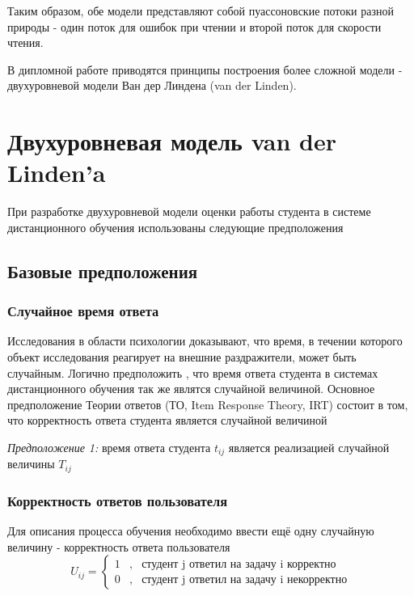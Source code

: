 Таким образом, обе модели представляют собой пуассоновские потоки разной природы - один поток для ошибок при чтении и второй поток для скорости чтения.

В дипломной работе приводятся принципы построения более сложной модели - \\двухуровневой модели Ван дер Линдена (van der Linden).

\section{Двухуровневая модель van der Linden'a}

При разработке двухуровневой модели оценки работы студента в системе \\дистанционного обучения использованы следующие предположения

\subsection{Базовые предположения}

\subsubsection{Случайное время ответа}

Исследования в области психологии доказывают, что время, в течении которого объект исследования реагирует на внешние раздражители, может быть случайным. Логично предположить , что время ответа студента в сис\-темах дистанционного обучения так же являтся случайной величиной. Ос\-новное предположение Теории ответов (ТО, Item Response Theory, IRT) со\-стоит в том, что корректность ответа студента является случайной величиной

{\itshape Предположение 1:} время ответа студента $t_{ij}$ является реализацией слу\-чайной величины $T_{ij}$

\subsubsection{Корректность ответов пользователя}

Для описания процесса обучения необходимо ввести ещё одну слу\-чайную величину - корректность ответа пользователя
$$
U_{ij} = 
\left\{
\begin{array}{ccl}
1 &,& \mbox{студент j ответил на задачу i корректно}\\
0 &,& \mbox{студент j ответил на задачу i некорректно}
\end{array}
\right.
$$

